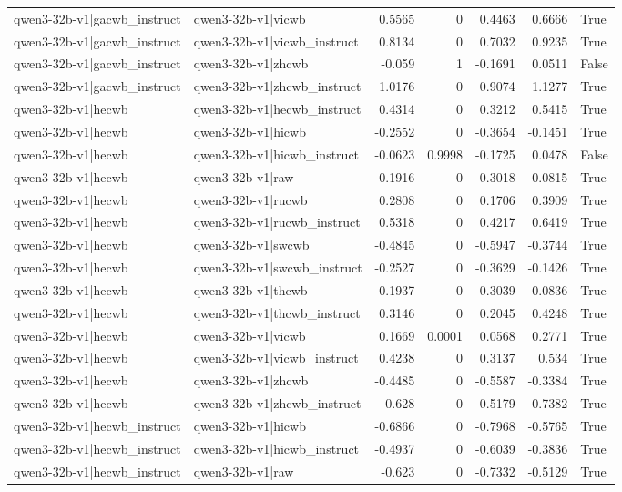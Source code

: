 \begin{table}
\begin{tabular}{l l r r r r l}
qwen3-32b-v1|gacwb_instruct & qwen3-32b-v1|vicwb & 0.5565 & 0 & 0.4463 & 0.6666 & True \\
qwen3-32b-v1|gacwb_instruct & qwen3-32b-v1|vicwb_instruct & 0.8134 & 0 & 0.7032 & 0.9235 & True \\
qwen3-32b-v1|gacwb_instruct & qwen3-32b-v1|zhcwb & -0.059 & 1 & -0.1691 & 0.0511 & False \\
qwen3-32b-v1|gacwb_instruct & qwen3-32b-v1|zhcwb_instruct & 1.0176 & 0 & 0.9074 & 1.1277 & True \\
qwen3-32b-v1|hecwb & qwen3-32b-v1|hecwb_instruct & 0.4314 & 0 & 0.3212 & 0.5415 & True \\
qwen3-32b-v1|hecwb & qwen3-32b-v1|hicwb & -0.2552 & 0 & -0.3654 & -0.1451 & True \\
qwen3-32b-v1|hecwb & qwen3-32b-v1|hicwb_instruct & -0.0623 & 0.9998 & -0.1725 & 0.0478 & False \\
qwen3-32b-v1|hecwb & qwen3-32b-v1|raw & -0.1916 & 0 & -0.3018 & -0.0815 & True \\
qwen3-32b-v1|hecwb & qwen3-32b-v1|rucwb & 0.2808 & 0 & 0.1706 & 0.3909 & True \\
qwen3-32b-v1|hecwb & qwen3-32b-v1|rucwb_instruct & 0.5318 & 0 & 0.4217 & 0.6419 & True \\
qwen3-32b-v1|hecwb & qwen3-32b-v1|swcwb & -0.4845 & 0 & -0.5947 & -0.3744 & True \\
qwen3-32b-v1|hecwb & qwen3-32b-v1|swcwb_instruct & -0.2527 & 0 & -0.3629 & -0.1426 & True \\
qwen3-32b-v1|hecwb & qwen3-32b-v1|thcwb & -0.1937 & 0 & -0.3039 & -0.0836 & True \\
qwen3-32b-v1|hecwb & qwen3-32b-v1|thcwb_instruct & 0.3146 & 0 & 0.2045 & 0.4248 & True \\
qwen3-32b-v1|hecwb & qwen3-32b-v1|vicwb & 0.1669 & 0.0001 & 0.0568 & 0.2771 & True \\
qwen3-32b-v1|hecwb & qwen3-32b-v1|vicwb_instruct & 0.4238 & 0 & 0.3137 & 0.534 & True \\
qwen3-32b-v1|hecwb & qwen3-32b-v1|zhcwb & -0.4485 & 0 & -0.5587 & -0.3384 & True \\
qwen3-32b-v1|hecwb & qwen3-32b-v1|zhcwb_instruct & 0.628 & 0 & 0.5179 & 0.7382 & True \\
qwen3-32b-v1|hecwb_instruct & qwen3-32b-v1|hicwb & -0.6866 & 0 & -0.7968 & -0.5765 & True \\
qwen3-32b-v1|hecwb_instruct & qwen3-32b-v1|hicwb_instruct & -0.4937 & 0 & -0.6039 & -0.3836 & True \\
qwen3-32b-v1|hecwb_instruct & qwen3-32b-v1|raw & -0.623 & 0 & -0.7332 & -0.5129 & True \\

\end{tabular}
\end{table}

